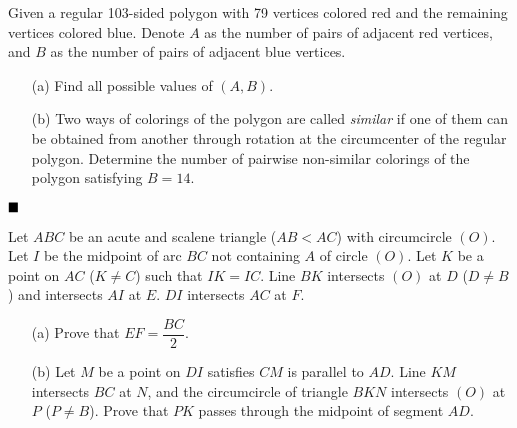 \documentclass[11pt]{article}
\newenvironment{solution}[1][Solution]{%
  \proof[\normalfont \faPenNib \hspace{0.2cm} \ttfamily \scshape \large #1]%
}{\(\hfill \blacksquare\){\parfillskip0pt\par}}
\theoremstyle{definition}
\begin{document}
        \newpage

        \begin{problem}
            Given a regular 103-sided polygon with 79 vertices colored red and the remaining vertices colored blue. Denote \(A\) as the number of pairs of adjacent red vertices, and \(B\) as the number of pairs of adjacent blue vertices.
            \begin{enumerate}
                \item[(a)] Find all possible values of \((A,B)\).
                \item[(b)] Two ways of colorings of the polygon are called \emph{similar} if one of them can be obtained from another through rotation at the circumcenter of the regular polygon. Determine the number of pairwise non-similar colorings of the polygon satisfying \(B = 14\).
            \end{enumerate}
        \end{problem}
        
        \begin{solution}
            
        \end{solution}

        \newpage

        \begin{problem}
            Let \(ABC\) be an acute and scalene triangle (\(AB < AC\)) with circumcircle \((O)\). Let \(I\) be the midpoint of arc \(BC\) not containing \(A\) of circle \((O)\). Let \(K\) be a point on \(AC\) (\(K \neq C\)) such that \(IK = IC\). Line \(BK\) intersects \((O)\) at \(D\) (\(D \neq B\)) and intersects \(AI\) at \(E\). \(DI\) intersects \(AC\) at \(F\).
            \begin{enumerate}
                \item[(a)] Prove that \(EF = \dfrac{BC}{2}\).
                \item[(b)] Let \(M\) be a point on \(DI\) satisfies \(CM\) is parallel to \(AD\). Line \(KM\) intersects \(BC\) at \(N\), and the circumcircle of triangle \(BKN\) intersects \((O)\) at \(P\) (\(P \neq B\)). Prove that \(PK\) passes through the midpoint of segment \(AD\).
            \end{enumerate}
        \end{problem}
\end{document}
